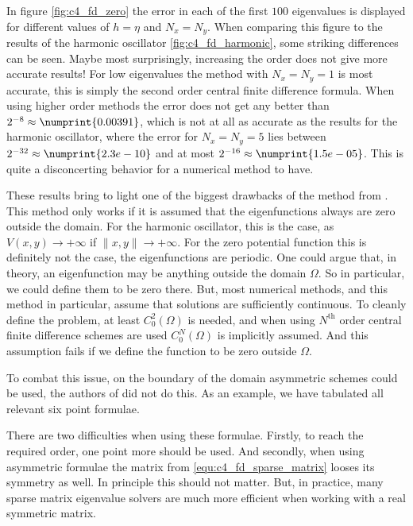 In figure \ref{fig:c4_fd_zero} the error in each of the first $100$ eigenvalues is displayed for different values of $h = \eta$ and $N_x = N_y$. When comparing this figure to the results of the harmonic oscillator \ref{fig:c4_fd_harmonic}, some striking differences can be seen. Maybe most surprisingly, increasing the order does not give more accurate results! For low eigenvalues the method with $N_x=N_y=1$ is most accurate, this is simply the second order central finite difference formula. When using higher order methods the error does not get any better than $2^{-8}\approx \numprint{0.00391}$, which is not at all as accurate as the results for the harmonic oscillator, where the error for $N_x=N_y = 5$ lies between $2^{-32} \approx \numprint{2.3e-10}$ and at most $2^{-16} \approx \numprint{1.5e-05}$. This is quite a disconcerting behavior for a numerical method to have.

These results bring to light one of the biggest drawbacks of the method from \cite{wang_new_2009}. This method only works if it is assumed that the eigenfunctions always are zero outside the domain. For the harmonic oscillator, this is the case, as $V(x, y) \to +\infty$ if $\|x, y\| \to +\infty$. For the zero potential function this is definitely not the case, the eigenfunctions are periodic. One could argue that, in theory, an eigenfunction may be anything outside the domain $\Omega$. So in particular, we could define them to be zero there. But, most numerical methods, and this method in particular, assume that solutions are sufficiently continuous. To cleanly define the problem, at least $C_0^2(\Omega)$ is needed, and when using $N^\text{th}$ order central finite difference schemes are used $C_0^{N}(\Omega)$ is implicitly assumed. And this assumption fails if we define the function to be zero outside $\Omega$.

To combat this issue, on the boundary of the domain asymmetric schemes could be used, the authors of \cite{wang_new_2009} did not do this. As an example, we have tabulated all relevant six point formulae.
\begin{center}
    
\end{center}
There are two difficulties when using these formulae. Firstly, to reach the required order, one point more should be used. And secondly, when using asymmetric formulae the matrix from \eqref{equ:c4_fd_sparse_matrix} looses its symmetry as well. In principle this should not matter. But, in practice, many sparse matrix eigenvalue solvers are much more efficient when working with a real symmetric matrix.

